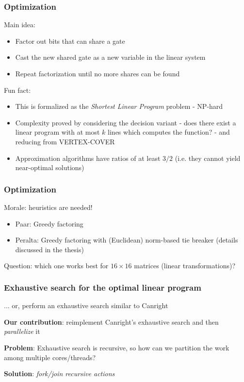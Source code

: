 \documentclass[handout]{beamer}
\begin{document}
\begin{frame}
	\frametitle{Optimization}
	Main idea:
	\begin{itemize}
		\item Factor out bits that can share a gate
		\item Cast the new shared gate as a new variable in the linear system
		\item Repeat factorization until no more shares can be found
	\end{itemize}

	\medskip 

	Fun fact:
	\begin{itemize}
		\item This is formalized as the \emph{Shortest Linear Program} problem - NP-hard
		\item Complexity proved by considering the decision variant - does there exist a linear program with at most $k$ lines which computes the function? - and reducing from VERTEX-COVER
		\item Approximation algorithms have ratios of at least $3/2$ (i.e. they cannot yield near-optimal solutions)
	\end{itemize}
\end{frame}

\begin{frame}
	\frametitle{Optimization}
	Morale: heuristics are needed!
	\begin{itemize}
		\item Paar: Greedy factoring
		\item Peralta: Greedy factoring with (Euclidean) norm-based tie breaker (details discussed in the thesis)
	\end{itemize}

	\medskip 

	Question: which one works best for $16 \times 16$ matrices (linear transformations)?
\end{frame}

\begin{frame}
	\frametitle{Exhaustive search for the optimal linear program}
	... or, perform an exhaustive search similar to Canright

	\medskip

	\textbf{Our contribution}: reimplement Canright's exhaustive search and then \emph{parallelize} it

	\medskip

	\textbf{Problem}: Exhaustive search is recursive, so how can we partition the work among multiple cores/threads? \frownie

	\medskip

	\textbf{Solution}: \emph{fork/join recursive actions} \smiley
\end{frame}
\end{document}
